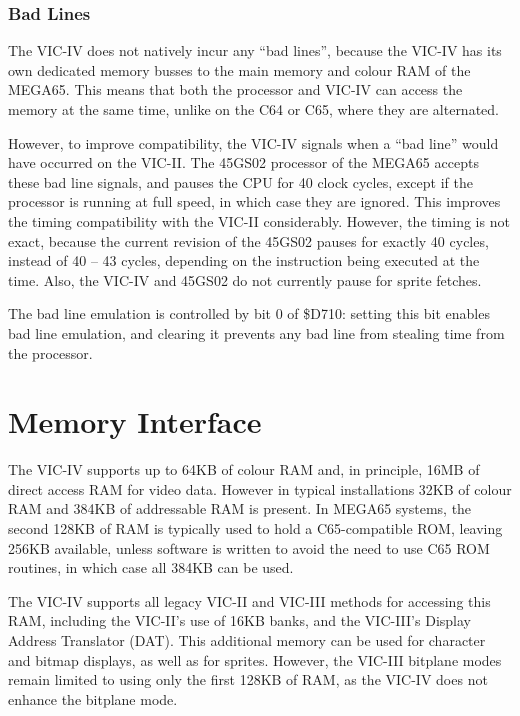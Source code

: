 \subsubsection{Bad Lines}

The VIC-IV does not natively incur any ``bad lines'', because the VIC-IV has its own dedicated memory busses to the main memory
and colour RAM of the MEGA65.  This means that both the processor and VIC-IV can access the memory at the same time, unlike on the
C64 or C65, where they are alternated.

However, to improve compatibility, the VIC-IV signals when a ``bad line'' would have occurred on the VIC-II.  The 45GS02 processor
of the MEGA65 accepts these bad line signals, and pauses the CPU for 40 clock cycles, except if the processor is running
at full speed, in which case they are ignored.  This improves the timing compatibility with the VIC-II considerably.  However,
the timing is not exact, because the current revision of the 45GS02 pauses for exactly 40 cycles, instead of 40 -- 43 cycles,
depending on the instruction being executed at the time. Also, the VIC-IV and 45GS02 do not currently pause for sprite fetches.


The bad line emulation is controlled by bit 0 of \$D710: setting this bit enables bad line emulation, and clearing it prevents
any bad line from stealing time from the processor.


\section{Memory Interface}

The VIC-IV supports up to 64KB of colour RAM and, in principle, 16MB of direct access RAM for video data.  However in typical installations
32KB of colour RAM and 384KB of addressable RAM is present. In MEGA65 systems, the second 128KB of RAM is typically used to hold a C65-compatible ROM, leaving 256KB available, unless software is written to avoid the need to use C65 ROM routines, in which case all 384KB can be used.

The VIC-IV supports all legacy VIC-II and VIC-III methods for accessing this RAM, including the VIC-II's use of 16KB banks, and the VIC-III's Display Address Translator (DAT).  This additional memory can be used for character and bitmap displays, as well as for sprites.  However, the VIC-III bitplane modes remain limited to using only the first 128KB of RAM, as the VIC-IV does not enhance the bitplane mode.

